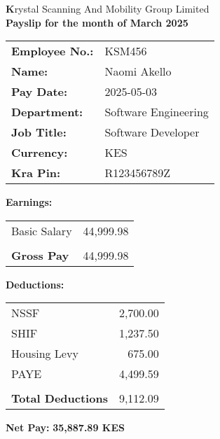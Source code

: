 \documentclass[a4paper]{article}
\begin{document}
\centering
\textbf Krystal Scanning And Mobility Group Limited \\
\textbf{Payslip for the month of March 2025}

\vspace{0.5cm}

\begin{tabular}{p{2.5in} p{2in}}
\toprule
\textbf{Employee No.:} & KSM456 \\
\textbf{Name:} & Naomi Akello \\
\textbf{Pay Date:} & 2025-05-03 \\
\textbf{Department:} & Software Engineering \\
\textbf{Job Title:} & Software Developer \\
\textbf{Currency:} & KES \\
\textbf{Kra Pin:} & R123456789Z \\
\bottomrule
\end{tabular}

\vspace{0.5cm}

\textbf{Earnings:} \\
\begin{tabular}{lr}
\toprule

Basic Salary & 44,999.98 \\
 \\
\midrule
\textbf{Gross Pay} & 44,999.98 \\
\bottomrule
\end{tabular}

\vspace{0.5cm}

\textbf{Deductions:} \\
\begin{tabular}{lr}
\toprule

NSSF & 2,700.00\\
SHIF & 1,237.50\\
Housing Levy & 675.00\\
PAYE & 4,499.59 \\
 \\
\midrule
\textbf{Total Deductions} & 9,112.09 \\
\bottomrule
\end{tabular}

\vspace{0.5cm}

\textbf{Net Pay:} \textbf{35,887.89 KES}

\vspace{0.5cm}
\end{document}
